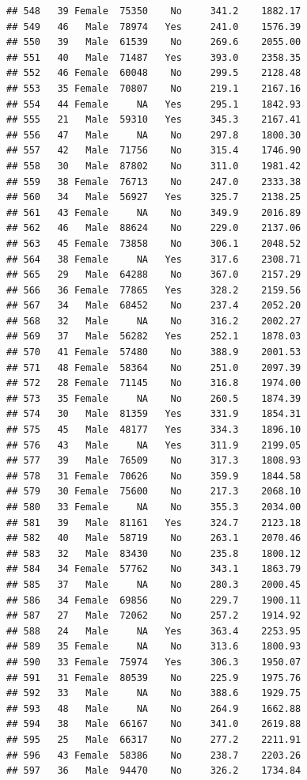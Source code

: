 \documentclass[12pt,]{krantz}
\theoremstyle{definition}
\theoremstyle{definition}
\theoremstyle{remark}
\begin{document}
\begin{verbatim}
## 548   39 Female  75350    No     341.2    1882.17
## 549   46   Male  78974   Yes     241.0    1576.39
## 550   39   Male  61539    No     269.6    2055.00
## 551   40   Male  71487   Yes     393.0    2358.35
## 552   46 Female  60048    No     299.5    2128.48
## 553   35 Female  70807    No     219.1    2167.16
## 554   44 Female     NA   Yes     295.1    1842.93
## 555   21   Male  59310   Yes     345.3    2167.41
## 556   47   Male     NA    No     297.8    1800.30
## 557   42   Male  71756    No     315.4    1746.90
## 558   30   Male  87802    No     311.0    1981.42
## 559   38 Female  76713    No     247.0    2333.38
## 560   34   Male  56927   Yes     325.7    2138.25
## 561   43 Female     NA    No     349.9    2016.89
## 562   46   Male  88624    No     229.0    2137.06
## 563   45 Female  73858    No     306.1    2048.52
## 564   38 Female     NA   Yes     317.6    2308.71
## 565   29   Male  64288    No     367.0    2157.29
## 566   36 Female  77865   Yes     328.2    2159.56
## 567   34   Male  68452    No     237.4    2052.20
## 568   32   Male     NA    No     316.2    2002.27
## 569   37   Male  56282   Yes     252.1    1878.03
## 570   41 Female  57480    No     388.9    2001.53
## 571   48 Female  58364    No     251.0    2097.39
## 572   28 Female  71145    No     316.8    1974.00
## 573   35 Female     NA    No     260.5    1874.39
## 574   30   Male  81359   Yes     331.9    1854.31
## 575   45   Male  48177   Yes     334.3    1896.10
## 576   43   Male     NA   Yes     311.9    2199.05
## 577   39   Male  76509    No     317.3    1808.93
## 578   31 Female  70626    No     359.9    1844.58
## 579   30 Female  75600    No     217.3    2068.10
## 580   33 Female     NA    No     355.3    2034.00
## 581   39   Male  81161   Yes     324.7    2123.18
## 582   40   Male  58719    No     263.1    2070.46
## 583   32   Male  83430    No     235.8    1800.12
## 584   34 Female  57762    No     343.1    1863.79
## 585   37   Male     NA    No     280.3    2000.45
## 586   34 Female  69856    No     229.7    1900.11
## 587   27   Male  72062    No     257.2    1914.92
## 588   24   Male     NA   Yes     363.4    2253.95
## 589   35 Female     NA    No     313.6    1800.93
## 590   33 Female  75974   Yes     306.3    1950.07
## 591   31 Female  80539    No     225.9    1975.76
## 592   33   Male     NA    No     388.6    1929.75
## 593   48   Male     NA    No     264.9    1662.88
## 594   38   Male  66167    No     341.0    2619.88
## 595   25   Male  66317    No     277.2    2211.91
## 596   43 Female  58386    No     238.7    2203.26
## 597   36   Male  94470    No     326.2    1734.84

\end{verbatim}
\end{document}
